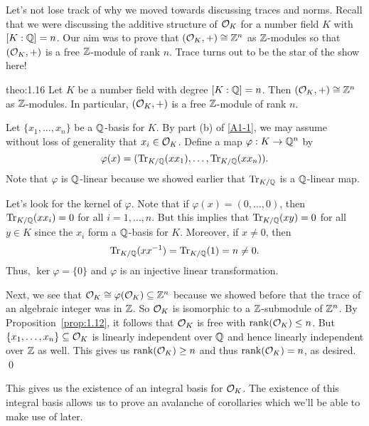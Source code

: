 Let's not lose track of why we moved towards discussing traces and norms. 
Recall that we were discussing the additive structure of ${\cal O}_K$ 
for a number field $K$ with $[K : \mathbb{Q}] = n$. 
Our aim was to prove that $({\cal O}_K, +) \cong \mathbb{Z}^n$ as $\mathbb{Z}$-modules 
so that $({\cal O}_K, +)$ is a free $\mathbb{Z}$-module of rank $n$. Trace turns 
out to be the star of the show here!

\begin{theo}{theo:1.16}
    Let $K$ be a number field with degree $[K : \mathbb{Q}] = n$. Then 
    $({\cal O}_K, +) \cong \mathbb{Z}^n$ as $\mathbb{Z}$-modules. In particular, 
    $({\cal O}_K, +)$ is a free $\mathbb{Z}$-module of rank $n$. 
\end{theo}
\begin{pf}
    Let $\{x_1, \dots, x_n\}$ be a $\mathbb{Q}$-basis for $K$. By part (b) of \ref{A1-1}, 
    we may assume without loss of generality that $x_i \in {\cal O}_K$. Define 
    a map $\varphi : K \to \mathbb{Q}^n$ by 
    \[ \varphi(x) = (\operatorname{Tr}_{K/\mathbb{Q}}(xx_1), \dots, \operatorname{Tr}_{K/\mathbb{Q}}(xx_n)). \] 
    Note that $\varphi$ is $\mathbb{Q}$-linear because we showed earlier that 
    $\operatorname{Tr}_{K/\mathbb{Q}}$ is a $\mathbb{Q}$-linear map. 

    Let's look for the kernel of $\varphi$. Note that if $\varphi(x) = 
    (0, \dots, 0)$, then $\operatorname{Tr}_{K/\mathbb{Q}}(xx_i) = 0$ for all $i = 1, \dots, n$. 
    But this implies that $\operatorname{Tr}_{K/\mathbb{Q}}(xy) = 0$ for all $y \in K$ since 
    the $x_i$ form a $\mathbb{Q}$-basis for $K$. Moreover, if $x \neq 0$, then
    \[ \operatorname{Tr}_{K/\mathbb{Q}}(xx^{-1}) = \operatorname{Tr}_{K/\mathbb{Q}}(1) = n \neq 0. \] 
    Thus, $\ker\varphi = \{0\}$ and $\varphi$ is an injective linear transformation.

    Next, we see that ${\cal O}_K \cong \varphi({\cal O}_K) \subseteq \mathbb{Z}^n$
    because we showed before that the trace of an algebraic integer 
    was in $\mathbb{Z}$. So ${\cal O}_K$ is isomorphic to a $\mathbb{Z}$-submodule of $\mathbb{Z}^n$. By 
    Proposition~\ref{prop:1.12}, it follows that ${\cal O}_K$ is free 
    with $\operatorname{rank}({\cal O}_K) \leq n$. But $\{x_1, \dots, x_n\} \subseteq 
    {\cal O}_K$ is linearly independent over $\mathbb{Q}$ and hence linearly independent 
    over $\mathbb{Z}$ as well. This gives us $\operatorname{rank}({\cal O}_K) \geq n$ and thus 
    $\operatorname{rank}({\cal O}_K) = n$, as desired. \qed
\end{pf}\vspace{-0.25cm}

This gives us the existence of an integral basis for ${\cal O}_K$. The existence 
of this integral basis allows us to prove an avalanche of 
corollaries which we'll be able to make use of later. 

